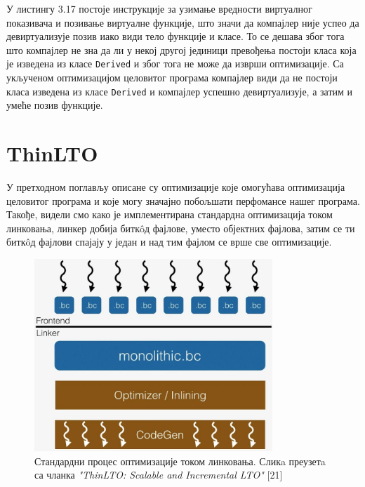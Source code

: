 \documentclass[12pt,oneside]{memoir}
\begin{document}
У листингу 3.17 постоје инструкције за узимање вредности
виртуалног показивача и позивање виртуалне функције, што значи да компајлер није успео
да девиртуализује позив иако види тело функције и класе.
То се дешава због тога што компајлер не зна да ли у некој другој јединици превођења
постоји класа која је изведена из класе \texttt{Derived} и због тога не може да изврши
оптимизације.
Са укљученом оптимизацијом целовитог програма компајлер види да не постоји класа
изведена из класе \texttt{Derived} и компајлер успешно девиртуализује, а затим и умеће
позив функције. 
 
 \chapter{ThinLTO}
 
 У претходном поглављу описане су оптимизације које омогућава оптимизација целовитог програма и које могу  значајно
 побољшати перфомансе нашег програма.
 Такође, видели смо како је имплементирана стандардна оптимизација током линковања,
  линкер добија битк\^{o}д фајлове, уместо објектних фајлова, затим се ти
 битк\^{o}д фајлови спајају у један и над тим фајлом се врше све оптимизације.
 
\begin{figure}[!ht]
  \centering
  \includegraphics[width=0.8\textwidth]{LTO_normal.png}
  \caption{Стандардни процес оптимизације током линковања. Сликa преузетa са чланка \textit{"ThinLTO: Scalable and Incremental LTO"} [21]}
  \label{fig:grafikon}
\end{figure}
\end{document}

